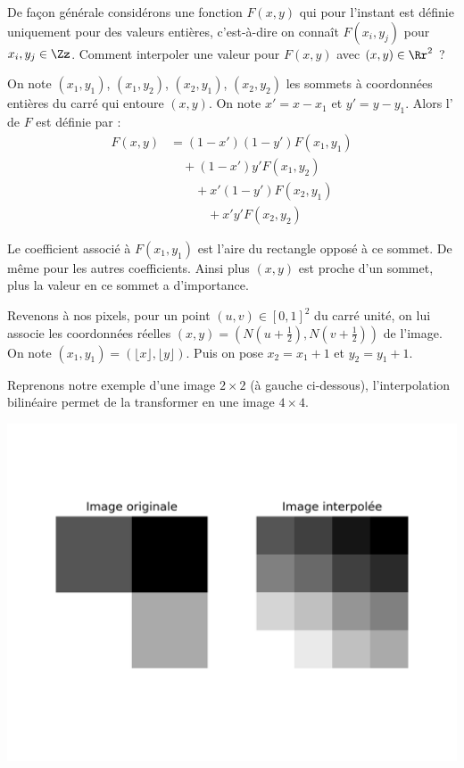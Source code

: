 \documentclass[11pt,class=report,crop=false]{standalone}
\begin{document}
De façon générale considérons une fonction $F(x,y)$ qui pour l'instant est définie uniquement pour des valeurs entières, c'est-à-dire on connaît $F(x_i,y_j)$ pour $x_i, y_j \in \Zz$.
Comment interpoler une valeur pour $F(x,y)$ avec $(x,y) \in \Rr^2$ ?

On note $(x_1,y_1)$, $(x_1,y_2)$, $(x_2,y_1)$, $(x_2,y_2)$ les sommets à coordonnées entières du carré qui entoure $(x,y)$.
On note $x' = x-x_1$ et $y' = y-y_1$. Alors l' de $F$ est définie par :
\begin{align*}
F(x,y) & = (1-x')(1-y')F(x_1,y_1) \\
       & \quad +  (1-x')y'F(x_1,y_2) \\
       & \quad\quad +  x'(1-y')F(x_2,y_1) \\
       & \quad\quad\quad +  x'y'F(x_2,y_2)
\end{align*}


      
Le coefficient associé à $F(x_1,y_1)$ est l'aire du rectangle opposé à ce sommet. De même pour les autres coefficients. Ainsi plus $(x,y)$ est proche d'un sommet, plus la valeur en ce sommet a d'importance.


Revenons à nos pixels, pour un point $(u,v) \in [0,1]^2$ du carré unité, on lui associe les coordonnées réelles $(x,y) = ( N(u+\frac12) , N(v+\frac12) )$ de l'image. On note $(x_1,y_1) = (\lfloor x \rfloor, \lfloor y \rfloor )$. Puis on pose $x_2=x_1+1$ et $y_2=y_1+1$.

Reprenons notre exemple d'une image $2 \times 2$ (à gauche ci-dessous), l'interpolation bilinéaire permet de la transformer en une image $4\times 4$.


\begin{center}
		\includegraphics[scale=\myscale,scale=0.7]{figures/interpolation_bilineaire_1}  
\end{center}
\end{document}
